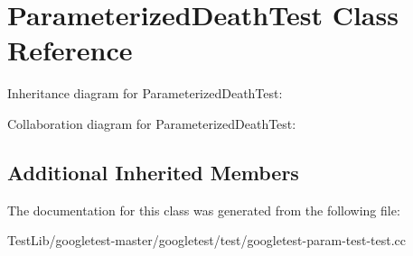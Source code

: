 \hypertarget{classParameterizedDeathTest}{}\section{Parameterized\+Death\+Test Class Reference}
\label{classParameterizedDeathTest}


Inheritance diagram for Parameterized\+Death\+Test\+:


Collaboration diagram for Parameterized\+Death\+Test\+:
\subsection*{Additional Inherited Members}


The documentation for this class was generated from the following file\+:\begin{DoxyCompactItemize}
\item 
Test\+Lib/googletest-\/master/googletest/test/googletest-\/param-\/test-\/test.\+cc\end{DoxyCompactItemize}
